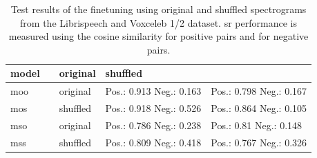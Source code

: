 \begin{table}[h]
    \centering
    \caption{Test results of the finetuning using original and shuffled spectrograms from the Librispeech and Voxceleb 1/2 dataset. \Gls{sr} performance is measured using the cosine similarity for positive pairs and for negative pairs.}

    \begin{tabular}{>{\centering\arraybackslash}p{1.5cm}| >{\centering\arraybackslash}p{2.5cm} >{\centering\arraybackslash}p{2.5cm}|>{\centering\arraybackslash}p{4cm}  >{\centering\arraybackslash}p{4cm}}
        \hline
        \scriptsize{model}
        & \multicolumn{2}{c|}{\scriptsize{pretraining $\downarrow$ / finetuning $\downarrow$ / test $\rightarrow$}} & original & shuffled \\
        \hline
        \gls{moo}
        & \multirow{2}{*}{original} 
        & original
        & \cellcolor[RGB]{255, 255, 255} Pos.: 0.913 Neg.: 0.163
        & \cellcolor[RGB]{255, 255, 255} Pos.: 0.798 Neg.: 0.167 \\
        \gls{mos}
        & 
        & shuffled
        & \cellcolor[RGB]{255, 255, 255} Pos.: 0.918 Neg.: 0.526
        & \cellcolor[RGB]{255, 255, 255} Pos.: 0.864 Neg.: 0.105 \\
        \hdashline
        \gls{mso}
        & \multirow{2}{*}{shuffled} & original
        & \cellcolor[RGB]{255, 255, 255} Pos.: 0.786 Neg.: 0.238
        & \cellcolor[RGB]{255, 255, 255} Pos.: 0.81 Neg.: 0.148 \\
        \gls{mss}
        & 
        & shuffled
        & \cellcolor[RGB]{255, 255, 255} Pos.: 0.809 Neg.: 0.418
        & \cellcolor[RGB]{255, 255, 255} Pos.: 0.767 Neg.: 0.326 \\
        \hline
    \end{tabular}

    \label{finetuning_v1_similarity_transformer}
\end{table}





